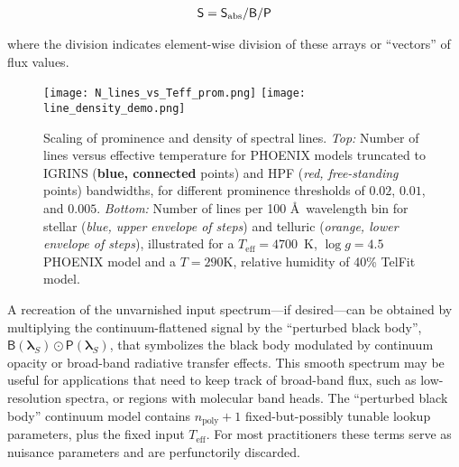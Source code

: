 \documentclass[trackchanges]{aastex631}
\begin{document}
\begin{eqnarray}
    \mathsf{S} = \mathsf{S}_{\rm abs}/\mathsf{B} / \mathsf{P}
    \label{eqnFlattening}
\end{eqnarray}

\noindent where the division indicates element-wise division of these arrays or ``vectors'' of flux values.  

\begin{figure}[hbt!]
    \centering
    \texttt{[image: N\_lines\_vs\_Teff\_prom.png]}
    \texttt{[image: line\_density\_demo.png]}
    \caption{Scaling of prominence and density of spectral lines.
        \emph{Top:} Number of lines versus effective temperature for PHOENIX models truncated to IGRINS (\textbf{blue, connected} points) and HPF (\emph{red, free-standing} points) bandwidths, for different prominence thresholds of $0.02$, $0.01$, and $0.005$.
        \emph{Bottom:} Number of lines per 100 \AA\ wavelength bin for stellar (\emph{blue, upper envelope of steps}) and telluric (\emph{orange, lower envelope of steps}), illustrated for a $T_\mathrm{eff}=4700$~K, $\log{g}=4.5$ PHOENIX model and a $T=290 \mathrm{K}$, relative humidity of 40\% TelFit model.}
    \label{fig_Nlines_vs_teff}
\end{figure}


A recreation of the unvarnished input spectrum---if desired---can be obtained by multiplying the continuum-flattened signal by the ``perturbed black body'', $\mathsf{B}(\bm{\lambda}_S)\odot \mathsf{P}(\bm{\lambda}_S)$, that symbolizes the black body modulated by continuum opacity or broad-band radiative transfer effects.  This smooth spectrum may be useful for applications that need to keep track of broad-band flux, such as low-resolution spectra, or regions with molecular band heads. The ``perturbed black body'' continuum model contains $n_{\mathrm{poly}}+1$ fixed-but-possibly tunable lookup parameters, plus the fixed input $T_{\mathrm{eff}}$.  For most practitioners these terms serve as nuisance parameters and are perfunctorily discarded.
\end{document}
